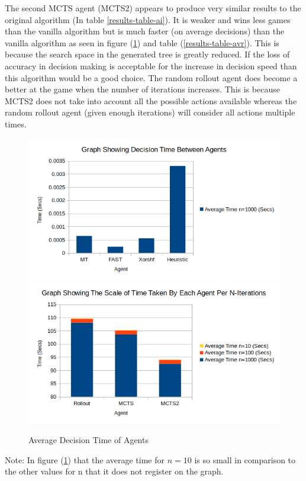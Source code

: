 \documentclass[journal]{IEEEtran}
\begin{document}
The second MCTS agent (MCTS2) appears to produce very similar results to the original algorithm (In table \ref{results-table-ai}). It is weaker and wins less games than the vanilla algorithm but is much faster (on average decisions) than the vanilla algorithm as seen in figure (\ref{avg-agent-graph}) and table (\ref{results-table-avr}). This is because the search space in the generated tree is greatly reduced. If the loss of accuracy in decision making is acceptable for the increase in decision speed than this algorithm would be a good choice. The random rollout agent does become a better at the game when the number of iterations increases. This is because MCTS2 does not take into account all the possible actions available whereas the random rollout agent (given enough iterations) will consider all actions multiple times.

\begin{figure}[ht]
  \includegraphics[width=.45\textwidth,scale=.50]{agent_avg_time_s}\\
  \includegraphics[width=.45\textwidth,scale=.50]{agent_avg_time_n}\\
  \centering
  \caption{Average Decision Time of Agents}
  \label{avg-agent-graph}
\end{figure}

\noindent Note: In figure (\ref{avg-agent-graph}) that the average time for $n=10$ is so small in comparison to the other values for n that it does not register on the graph.
\end{document}
